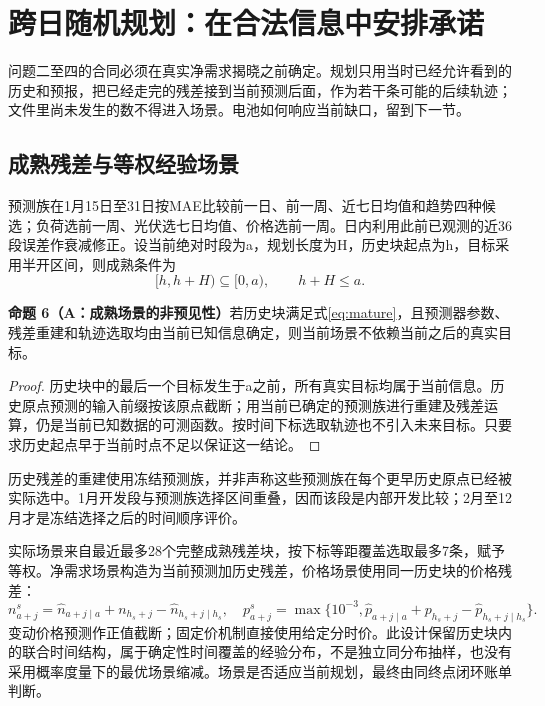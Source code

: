\documentclass[UTF8,a4paper,zihao=-4,fontset=mac]{ctexart}
\newcommand{\pp}[2]{\par\noindent\textbf{命题 #1（#2）}\quad}
\begin{document}
\section{跨日随机规划：在合法信息中安排承诺}
问题二至四的合同必须在真实净需求揭晓之前确定。规划只用当时已经允许看到的历史和预报，把已经走完的残差接到当前预测后面，作为若干条可能的后续轨迹；文件里尚未发生的数不得进入场景。电池如何响应当前缺口，留到下一节。

\subsection{成熟残差与等权经验场景}
预测族在1月15日至31日按MAE比较前一日、前一周、近七日均值和趋势四种候选；负荷选前一周、光伏选七日均值、价格选前一周。日内利用此前已观测的近36段误差作衰减修正。设当前绝对时段为a，规划长度为H，历史块起点为h，目标采用半开区间，则成熟条件为
\begin{equation}\label{eq:mature}
 [h,h+H)\subseteq[0,a),\qquad h+H\le a.
\end{equation}
\pp{6}{A：成熟场景的非预见性}若历史块满足式\eqref{eq:mature}，且预测器参数、残差重建和轨迹选取均由当前已知信息确定，则当前场景不依赖当前之后的真实目标。
\begin{proof}
历史块中的最后一个目标发生于a之前，所有真实目标均属于当前信息。历史原点预测的输入前缀按该原点截断；用当前已确定的预测族进行重建及残差运算，仍是当前已知数据的可测函数。按时间下标选取轨迹也不引入未来目标。只要求历史起点早于当前时点不足以保证这一结论。
\end{proof}
历史残差的重建使用冻结预测族，并非声称这些预测族在每个更早历史原点已经被实际选中。1月开发段与预测族选择区间重叠，因而该段是内部开发比较；2月至12月才是冻结选择之后的时间顺序评价。

实际场景来自最近最多28个完整成熟残差块，按下标等距覆盖选取最多7条，赋予等权。净需求场景构造为当前预测加历史残差，价格场景使用同一历史块的价格残差：
\begin{equation}\label{eq:scenario}
 n_{a+j}^{s}=\widehat n_{a+j\mid a}+n_{h_s+j}-\widehat n_{h_s+j\mid h_s},\quad
 p_{a+j}^{s}=\max\{10^{-3},\widehat p_{a+j\mid a}+p_{h_s+j}-\widehat p_{h_s+j\mid h_s}\}.
\end{equation}
变动价格预测作正值截断；固定价机制直接使用给定分时价。此设计保留历史块内的联合时间结构，属于确定性时间覆盖的经验分布，不是独立同分布抽样，也没有采用概率度量下的最优场景缩减\cite{dupacova2003,kaut2007}。场景是否适应当前规划，最终由同终点闭环账单判断。


\end{document}
